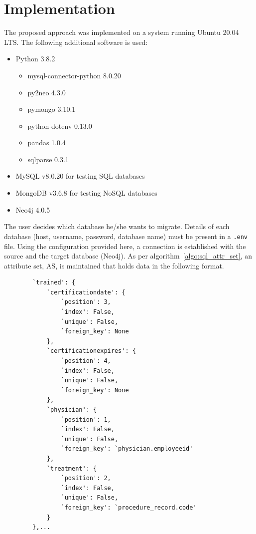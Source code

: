 \documentclass[12pt]{article}
\newcommand{\sectionfontstyle}{\fontsize{16pt}{1em}\usefont{T1}{phv}{b}{n}}
\begin{document}
    \clearpage

    \section{\sectionfontstyle Implementation}
    \label{sec:impl}
    The proposed approach was implemented on a system running Ubuntu 20.04 LTS. The following additional software is used:
    \begin{itemize}
        \item Python 3.8.2
        \begin{itemize}
            \item mysql-connector-python 8.0.20
            \item py2neo 4.3.0
            \item pymongo 3.10.1
            \item python-dotenv 0.13.0
            \item pandas 1.0.4
            \item sqlparse 0.3.1
        \end{itemize}
        \item MySQL v8.0.20 for testing SQL databases
        \item MongoDB v3.6.8 for testing NoSQL databases
        \item Neo4j 4.0.5
    \end{itemize}

    The user decides which database he/she wants to migrate. Details of each database (host, username, password, database name) must be present in a \verb|.env| file. Using the configuration provided here, a connection is established with the source and the target database (Neo4j). As per algorithm~\ref{algo:sql_attr_set}, an attribute set, AS, is maintained that holds data in the following format.
    \begin{lstlisting}
        `trained': {
            `certificationdate': {
                `position': 3, 
                `index': False, 
                `unique': False, 
                `foreign_key': None
            },
            `certificationexpires': {
                `position': 4, 
                `index': False, 
                `unique': False, 
                `foreign_key': None
            },
            `physician': {
                `position': 1, 
                `index': False, 
                `unique': False, 
                `foreign_key': `physician.employeeid'
            },
            `treatment': {
                `position': 2, 
                `index': False, 
                `unique': False, 
                `foreign_key': `procedure_record.code'
            }
        },...
    \end{lstlisting}
\end{document}
